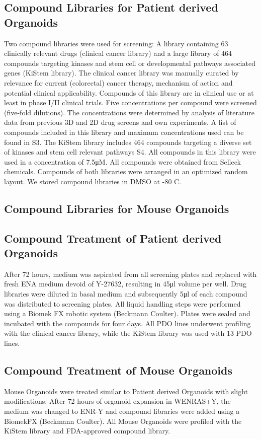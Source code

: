 \begin{flushleft}
\subsection{Compound Libraries for Patient derived Organoids}
Two compound libraries were used for screening: A library containing 63 clinically relevant drugs (clinical cancer library) and a large library of 464 compounds targeting kinases and stem cell or developmental pathways associated genes (KiStem library). The clinical cancer library was manually curated by relevance for current (colorectal) cancer therapy, mechanism of action and potential clinical applicability. Compounds of this library are in clinical use or at least in phase I/II clinical trials. Five concentrations per compound were screened (five-fold dilutions). The concentrations were determined by analysis of literature data from previous 3D and 2D drug screens and own experiments. A list of compounds included in this library and maximum concentrations used can be found in S3. The KiStem library includes 464 compounds targeting a diverse set of kinases and stem cell relevant pathways S4. All compounds in this library were used in a concentration of 7.5μM. All compounds were obtained from Selleck chemicals. Compounds of both libraries were arranged in an optimized random layout. We stored compound libraries in DMSO at -80 C.

\subsection{Compound Libraries for Mouse Organoids}

\subsection{Compound Treatment of Patient derived Organoids}
After 72 hours, medium was aspirated from all screening plates and replaced with fresh ENA medium devoid of Y-27632, resulting in 45μl volume per well. Drug libraries were diluted in basal medium and subsequently 5μl of each compound was distributed to screening plates. 
All liquid handling steps were performed using a Biomek FX robotic system (Beckmann Coulter). Plates were sealed and incubated with the compounds for four days. All PDO lines underwent profiling with the clinical cancer library, while the KiStem library was used with 13 PDO lines.

\subsection{Compound Treatment of Mouse Organoids}
Mouse Organoids were treated similar to Patient derived Organoids with slight modifications: After 72 hours of organoid expansion in WENRAS+Y, the medium was changed to ENR-Y and compound libraries were added using a BiomekFX (Beckmann Coulter). All Mouse Organoids were profiled with the KiStem library and FDA-approved compound library.


\end{flushleft}
